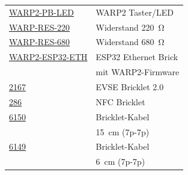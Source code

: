 \documentclass[a4paper,10pt]{article}
\begin{document}
\begin{multicols*}{2}
\begin{tabular}{ll}
		\cmidrule(lr{0.5em}){1-2} 
		\href{https://www.tinkerforge.com/de/shop/warp/warp2-spare-parts/warp2-pb-led-set.html}{WARP2-PB-LED}                       & WARP2 Taster/LED                     \\
		\cmidrule(lr{0.5em}){1-2} 
		\href{https://www.tinkerforge.com/de/shop/warp/warp2-spare-parts/warp-res-220.html}{WARP-RES-220}                           & Widerstand \SI{220}{\ohm}            \\
		\cmidrule(lr{0.5em}){1-2} 
		\href{https://www.tinkerforge.com/de/shop/warp/warp2-spare-parts/warp-res-680.html}{WARP-RES-680}                           & Widerstand \SI{680}{\ohm}            \\
		\cmidrule(lr{0.5em}){1-2}
		\href{https://www.tinkerforge.com/de/shop/warp/warp2-spare-parts/warp2-esp32-eth.html}{WARP2-ESP32-ETH}	                    & ESP32 Ethernet Brick                 \\
		                                                                                                                            & mit WARP2-Firmware                   \\
		\cmidrule(lr{0.5em}){1-2}
		\href{https://www.tinkerforge.com/de/shop/warp/warp2-spare-parts/evse-v2-bricklet.html}{2167}                               & EVSE Bricklet 2.0                    \\
		\cmidrule(lr{0.5em}){1-2}
		\href{https://www.tinkerforge.com/de/shop/warp/warp2-spare-parts/nfc-bricklet.html}{286}                                    & NFC Bricklet                         \\
		\cmidrule(lr{0.5em}){1-2}
		\href{https://www.tinkerforge.com/de/shop/accessories/cable/bricklet-cable-15cm-7p-7p.html}{6150}                           & Bricklet-Kabel                       \\
		                                                                                                                            & \SI{15}{\centi\meter} (7p-7p)        \\
		\cmidrule(lr{0.5em}){1-2}
		\href{https://www.tinkerforge.com/de/shop/accessories/cable/bricklet-cable-6cm-7p-7p.html}{6149}                            & Bricklet-Kabel                       \\
		                                                                                                                            & \SI{6}{\centi\meter} (7p-7p)         \\
	\end{tabular}


\end{multicols*}
\end{document}
